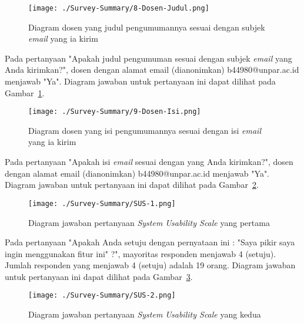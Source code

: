 \begin{figure}[H]
	\centering  
	\texttt{[image: ./Survey-Summary/8-Dosen-Judul.png]}
	\caption[Diagram dosen yang judul pengumumannya sesuai dengan subjek \textit{email} yang ia kirim]{Diagram dosen yang judul pengumumannya sesuai dengan subjek \textit{email} yang ia kirim} 
	\label{fig:summary-8-Dosen-Judul} 
\end{figure}

Pada pertanyaan "Apakah judul pengumuman sesuai dengan subjek \textit{email} yang Anda kirimkan?", dosen dengan alamat email (dianonimkan) b44980@unpar.ac.id menjawab "Ya". Diagram jawaban untuk pertanyaan ini dapat dilihat pada Gambar~\ref{fig:summary-8-Dosen-Judul}.

\begin{figure}[H]
	\centering  
	\texttt{[image: ./Survey-Summary/9-Dosen-Isi.png]}
	\caption[Diagram dosen yang isi pengumumannya sesuai dengan isi \textit{email} yang ia kirim]{Diagram dosen yang isi  pengumumannya sesuai dengan isi \textit{email} yang ia kirim} 
	\label{fig:summary-9-Dosen-Isi} 
\end{figure}

Pada pertanyaan "Apakah isi \textit{email} sesuai dengan yang Anda kirimkan?", dosen dengan alamat email (dianonimkan) b44980@unpar.ac.id menjawab "Ya". Diagram jawaban untuk pertanyaan ini dapat dilihat pada Gambar~\ref{fig:summary-9-Dosen-Isi}.

\begin{figure}[H]
	\centering  
	\texttt{[image: ./Survey-Summary/SUS-1.png]}
	\caption[Diagram jawaban pertanyaan \textit{System Usability Scale} yang pertama]{Diagram jawaban pertanyaan \textit{System Usability Scale} yang pertama} 
	\label{fig:summary-SUS-1} 
\end{figure}

Pada pertanyaan "Apakah Anda setuju dengan pernyataan ini : "Saya pikir saya ingin menggunakan fitur ini" ?", mayoritas responden menjawab 4 (setuju). Jumlah responden yang menjawab 4 (setuju) adalah 19 orang. Diagram jawaban untuk pertanyaan ini dapat dilihat pada Gambar~\ref{fig:summary-SUS-1}.

\begin{figure}[H]
	\centering  
	\texttt{[image: ./Survey-Summary/SUS-2.png]}
	\caption[Diagram jawaban pertanyaan \textit{System Usability Scale} yang kedua]{Diagram jawaban pertanyaan \textit{System Usability Scale} yang kedua} 
	\label{fig:summary-SUS-2} 
\end{figure}

